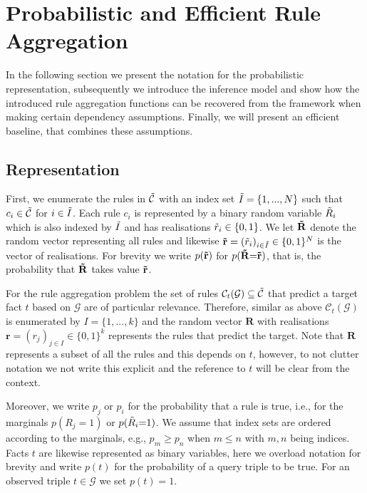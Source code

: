 \documentclass{article}
\theoremstyle{plain}
\theoremstyle{remark}
\newcommand{\allatomrules}{\Tilde{\mathcal{C}}}
\newcommand{\atomrule}{c}
\newcommand{\vecallrules}{\mathbf{\Tilde{r}}}
\newcommand{\vecallfiredrules}{\mathbf{r}}
\newcommand{\randomvecallrules}{\mathbf{\Tilde{R}}}
\newcommand{\randomvecfiredrules}{\mathbf{R}}
\newcommand{\oneruleassignment}{\Tilde{r}}
\newcommand{\onerulRV}{\Tilde{R}}
\newcommand{\oneFiredrulRV}{R}
\newcommand{\triple}{t}
\newcommand{\alltriples}{\mathcal{G}}
\newcommand{\indexSetAll}{\Tilde{I}}
\newcommand{\indexSetFired}{I}
\newcommand{\tFiredAtomRulesG}{\mathcal{C}_\triple(\alltriples)}
\begin{document}


\section{Probabilistic and Efficient Rule Aggregation}\label{sec: main probab aggregation}


In the following section we present the notation for the probabilistic representation, subsequently we introduce the inference model and show how the introduced rule aggregation functions can be recovered from the framework when making certain dependency assumptions. Finally, we will present an efficient baseline, that combines these assumptions.

\subsection{Representation}\label{sec: representation}
First, we enumerate the rules in $\allatomrules$ with an index set $\indexSetAll = \{1, ... , N\}$ such that  $\atomrule_i \in \allatomrules$ for $i \in \indexSetAll$. Each rule $\atomrule_i$ is represented by a binary random variable $\onerulRV_i$ which is also indexed by $\indexSetAll$ and has realisations $\oneruleassignment_i \in \{0,1\}$. We let $\randomvecallrules$ denote the random vector representing all rules and likewise $\vecallrules = (\oneruleassignment_i)_{i \in \indexSetAll} \in \{0, 1\}^N$ is the vector of realisations. For brevity we write $p(\vecallrules)$ for $p(\randomvecallrules{=}\vecallrules)$, that is, the probability that $\randomvecallrules$ takes value $\vecallrules$.

For the rule aggregation problem the set of rules $\tFiredAtomRulesG \subseteq \allatomrules$ that predict a target fact $\triple$ based on $\alltriples$ are of particular relevance. Therefore, similar as above $\tFiredAtomRulesG$ is enumerated by $\indexSetFired=\{1, ..., k\}$ and the random vector $\randomvecfiredrules$ with realisations $\vecallfiredrules = (r_j)_{j \in I} \in \{0, 1\}^k$ represents the rules that predict the target. Note that $\randomvecfiredrules$ represents a subset of all the rules and this depends on $t$, however, to not clutter notation we not write this explicit and the reference to $\triple$ will be clear from the context. 

Moreover, we write $p_j$ or $p_i$ for the probability that a rule is true, i.e.,  for the marginals $p(\oneFiredrulRV_j{=}1)$ or $p(\onerulRV_i{=}1)$. We assume that index sets are ordered according to the marginals, e.g., $p_m \geq p_n$ when $m \leq n$ with $m,n$ being indices. Facts $t$ are likewise represented as binary variables, here we overload notation for brevity and write $p(t)$ for the probability of a query triple to be true. For an observed triple $t \in \alltriples$ we set $p(t)=1$.
\end{document}
